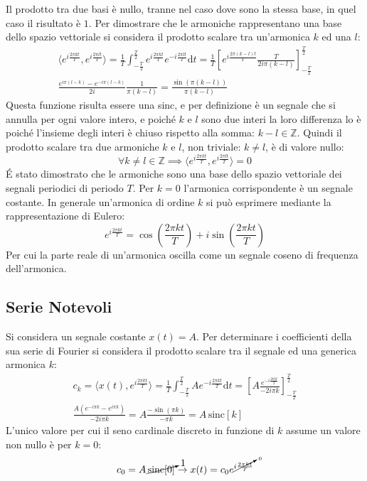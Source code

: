 \documentclass{article}
\newcommand{\sinc}{\mathrm{sinc}}
\newcommand{\df}{\mathrm{d}}
\numberwithin{equation}{subsection}
\begin{document}
Il prodotto tra due basi è nullo, tranne nel caso dove sono la stessa base, in quel caso il risultato è $1$. Per dimostrare che le armoniche rappresentano una base dello 
spazio vettoriale si considera il prodotto scalare tra un'armonica $k$ ed una $l$:
\begin{gather*}
    \langle e^{i\frac{2\pi kt}{T}},e^{i\frac{2\pi lt}{T}}\rangle=\displaystyle\frac{1}{T}\int_{-\frac{T}{2}}^{\frac{T}{2}}e^{i\frac{2\pi kt}{T}}e^{-i\frac{2\pi lt}{T}}\df t=
    \frac{1}{T}\left[e^{i\frac{2\pi(k-l)t}{T}}\frac{T}{2i\pi (k-l)}\right]^{\frac{T}{2}}_{-\frac{T}{2}}\\
    \displaystyle\frac{e^{i\pi(l-k)}-e^{-i\pi(l-k)}}{2i}\frac{1}{\pi (k-l)}=\frac{\sin(\pi(k-l))}{\pi (k-l)}
\end{gather*} 
Questa funzione risulta essere una sinc, e per definizione è un segnale che si annulla per ogni valore intero, e poiché $k$ e $l$ sono due interi la loro differenza lo è 
poiché l'insieme degli interi è chiuso rispetto alla somma: $k-l\in\mathbb{Z}$. Quindi il prodotto scalare tra due armoniche $k$ e $l$, non triviale: $k\neq l$, è di valore 
nullo:
\begin{equation*}
    \forall k\neq l\in\mathbb{Z}\implies \langle e^{i\frac{2\pi kt}{T}},e^{i\frac{2\pi lt}{T}}\rangle=0
\end{equation*}
\'{E} stato dimostrato che le armoniche sono una base dello spazio vettoriale dei segnali periodici di periodo $T$. 
Per $k=0$ l'armonica corrispondente è un segnale costante. In generale un'armonica di ordine $k$ si può esprimere mediante la rappresentazione di Eulero:
\begin{equation*}
    \displaystyle e^{i\frac{2\pi kt}{T}}=\cos\left(\frac{2\pi kt}{T}\right)+i\sin\left(\frac{2\pi kt}{T}\right)
\end{equation*}
Per cui la parte reale di un'armonica oscilla come un segnale coseno di frequenza dell'armonica. 

\subsection{Serie Notevoli}

Si considera un segnale costante $x(t)=A$. Per determinare i coefficienti della sua serie di Fourier si considera il prodotto scalare tra il segnale ed una generica armonica $k$: 
\begin{gather*}
    c_k=\langle x(t),e^{i\frac{2\pi kt}{T}}\rangle=\displaystyle\frac{1}{T}\int_{-\frac{T}{2}}^{\frac{T}{2}}Ae^{-i\frac{2\pi kt}{T}}\df t=\left[A\frac{e^{-i\frac{2\pi kt}{T}}}{-2i\pi k}\right]_{-\frac{T}{2}}^{\frac{T}{2}}\\
    \displaystyle\frac{A(e^{-i\pi k}-e^{i\pi k})}{-2i\pi k}=A\frac{-\sin(\pi k)}{-\pi k}=A\,\sinc[k]
\end{gather*}
L'unico valore per cui il seno cardinale discreto in funzione di $k$ assume un valore non nullo è per $k=0$:
\begin{equation*}
    c_0=A\,\cancelto{1}{\sinc[0]}\to x(t)=c_0e^{\cancelto{0}{i\frac{2\pi kt}{T}}}
\end{equation*}
\end{document}
